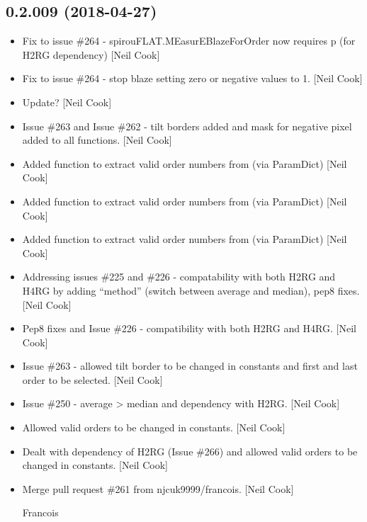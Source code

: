\documentclass[a4paper,10pt,english]{report}
\begin{document}
\subsection{0.2.009 (2018-04-27)}
\label{\detokenize{misc/changelog:id450}}\begin{itemize}
\item {} 
Fix to issue \#264 - spirouFLAT.MEasurEBlazeForOrder now requires p
(for H2RG dependency) {[}Neil Cook{]}

\item {} 
Fix to issue \#264 - stop blaze setting zero or negative values to 1.
{[}Neil Cook{]}

\item {} 
Update? {[}Neil Cook{]}

\item {} 
Issue \#263 and Issue \#262 - tilt borders added and mask for negative
pixel added to all functions. {[}Neil Cook{]}

\item {} 
Added function to extract valid order numbers from 
(via ParamDict) {[}Neil Cook{]}

\item {} 
Added function to extract valid order numbers from 
(via ParamDict) {[}Neil Cook{]}

\item {} 
Added function to extract valid order numbers from 
(via ParamDict) {[}Neil Cook{]}

\item {} 
Addressing issues \#225 and \#226 - compatability with both H2RG and
H4RG by adding “method” (switch between average and median), pep8
fixes. {[}Neil Cook{]}

\item {} 
Pep8 fixes and Issue \#226 - compatibility with both H2RG and H4RG.
{[}Neil Cook{]}

\item {} 
Issue \#263 - allowed tilt border to be changed in constants and first
and last order to be selected. {[}Neil Cook{]}

\item {} 
Issue \#250 - average \textendash{}\textgreater{} median and dependency with H2RG. {[}Neil Cook{]}

\item {} 
Allowed valid orders to be changed in constants. {[}Neil Cook{]}

\item {} 
Dealt with dependency of H2RG (Issue \#266) and allowed valid orders to
be changed in constants. {[}Neil Cook{]}

\item {} 
Merge pull request \#261 from njcuk9999/francois. {[}Neil Cook{]}

Francois

\end{itemize}
\end{document}
